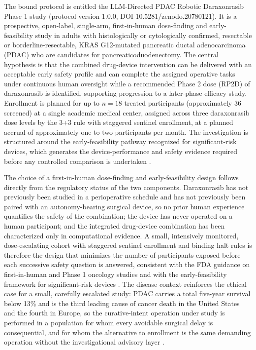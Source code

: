 The bound protocol is entitled the LLM-Directed PDAC Robotic Daraxonrasib Phase 1
study (protocol version 1.0.0, DOI 10.5281/zenodo.20780121). It is a prospective,
open-label, single-arm, first-in-human dose-finding and early-feasibility study in
adults with histologically or cytologically confirmed, resectable or
borderline-resectable, KRAS G12-mutated pancreatic ductal adenocarcinoma (PDAC)
who are candidates for pancreaticoduodenectomy. The central hypothesis is that the
combined drug-device intervention can be delivered with an acceptable early safety
profile and can complete the assigned operative tasks under continuous human
oversight while a recommended Phase 2 dose (RP2D) of daraxonrasib is identified,
supporting progression to a later-phase efficacy study. Enrollment is planned for
up to $n=18$ treated participants (approximately 36 screened) at a single academic
medical center, assigned across three daraxonrasib dose levels by the 3+3 rule
with staggered sentinel enrollment, at a planned accrual of approximately one to
two participants per month. The investigation is structured around the
early-feasibility pathway recognized for significant-risk devices, which generates
the device-performance and safety evidence required before any controlled
comparison is undertaken \cite{phase1guidance,daraxwhipple}.

The choice of a first-in-human dose-finding and early-feasibility design follows
directly from the regulatory status of the two components. Daraxonrasib has not
previously been studied in a perioperative schedule and has not previously been
paired with an autonomy-bearing surgical device, so no prior human experience
quantifies the safety of the combination; the device has never operated on a human
participant; and the integrated drug-device combination has been characterized only
in computational evidence. A small, intensively monitored, dose-escalating cohort
with staggered sentinel enrollment and binding halt rules is therefore the design
that minimizes the number of participants exposed before each successive safety
question is answered, consistent with the FDA guidance on first-in-human and Phase 1
oncology studies and with the early-feasibility framework for significant-risk
devices \cite{phase1guidance,oncotrialllm}. The disease context reinforces the
ethical case for a small, carefully escalated study: PDAC carries a total five-year
survival below 13\% and is the third leading cause of cancer death in the United
States and the fourth in Europe, so the curative-intent operation under study is
performed in a population for whom every avoidable surgical delay is consequential,
and for whom the alternative to enrollment is the same demanding operation without
the investigational advisory layer \cite{pdac060s2030}.

